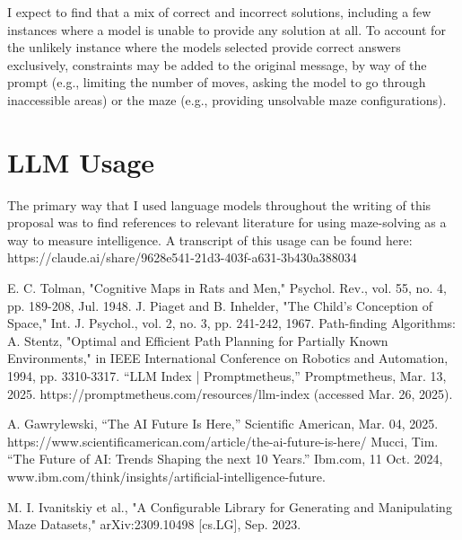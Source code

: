 \documentclass[conference]{IEEEtran}
\begin{document}
I expect to find that a mix of correct and incorrect solutions, including a few instances where a model is unable to provide any solution at all. To account for the unlikely instance where the models selected provide correct answers exclusively, constraints may be added to the original message, by way of the prompt (e.g., limiting the number of moves, asking the model to go through inaccessible areas) or the maze (e.g., providing unsolvable maze configurations).

\section{LLM Usage}

The primary way that I used language models throughout the writing of this proposal was to find references to relevant literature for using maze-solving as a way to measure intelligence. A transcript of this usage can be found here: https://claude.ai/share/9628e541-21d3-403f-a631-3b430a388034

\begin{thebibliography}{00}
 E. C. Tolman, "Cognitive Maps in Rats and Men," Psychol. Rev., vol. 55, no. 4, pp. 189-208, Jul. 1948.
 J. Piaget and B. Inhelder, "The Child's Conception of Space," Int. J. Psychol., vol. 2, no. 3, pp. 241-242, 1967.
 Path-finding Algorithms: A. Stentz, "Optimal and Efficient Path Planning for Partially Known Environments," in IEEE International Conference on Robotics and Automation, 1994, pp. 3310-3317.
 “LLM Index | Promptmetheus,” Promptmetheus, Mar. 13, 2025. https://promptmetheus.com/resources/llm-index (accessed Mar. 26, 2025).

 A. Gawrylewski, “The AI Future Is Here,” Scientific American, Mar. 04, 2025. https://www.scientificamerican.com/article/the-ai-future-is-here/
 Mucci, Tim. “The Future of AI: Trends Shaping the next 10 Years.” Ibm.com, 11 Oct. 2024, www.ibm.com/think/insights/artificial-intelligence-future.

 M. I. Ivanitskiy et al., "A Configurable Library for Generating and Manipulating Maze Datasets," arXiv:2309.10498 [cs.LG], Sep. 2023.
\end{thebibliography}
\end{document}
